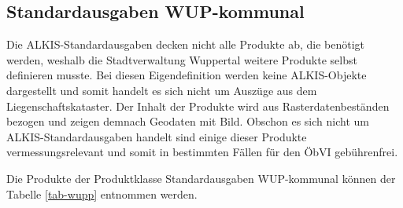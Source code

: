 \subsection{Standardausgaben WUP-kommunal}

Die ALKIS-Standardausgaben decken nicht alle Produkte ab, die benötigt werden, weshalb die Stadtverwaltung Wuppertal weitere Produkte selbst definieren musste.
Bei diesen Eigendefinition werden keine ALKIS-Objekte dargestellt und somit handelt es sich nicht um Auszüge aus dem Liegenschaftskataster.
Der Inhalt der Produkte wird aus Rasterdatenbeständen bezogen und zeigen demnach Geodaten mit Bild.
Obschon es sich nicht um ALKIS-Standardausgaben handelt sind einige dieser Produkte vermessungsrelevant und somit in bestimmten Fällen für den ÖbVI gebührenfrei.

Die Produkte der Produktklasse Standardausgaben WUP-kommunal können der Tabelle \ref{tab-wupp} entnommen werden.


